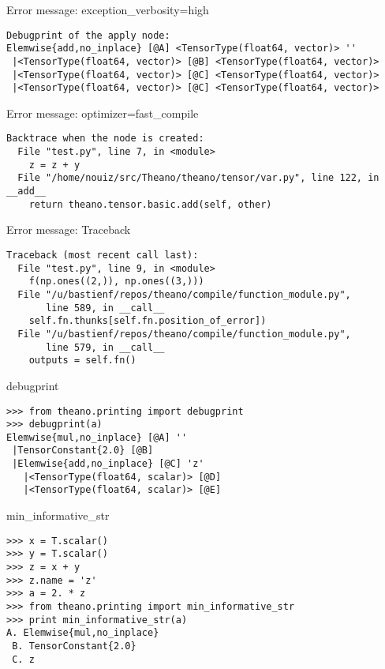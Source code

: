 \documentclass[utf8x]{beamer}
\begin{document}
\begin{frame}[fragile]{Error message: exception\_verbosity=high}
\begin{lstlisting}
Debugprint of the apply node:
Elemwise{add,no_inplace} [@A] <TensorType(float64, vector)> ''
 |<TensorType(float64, vector)> [@B] <TensorType(float64, vector)>
 |<TensorType(float64, vector)> [@C] <TensorType(float64, vector)>
 |<TensorType(float64, vector)> [@C] <TensorType(float64, vector)>
\end{lstlisting}
\end{frame}

\begin{frame}[fragile]{Error message: optimizer=fast\_compile}
\begin{lstlisting}
Backtrace when the node is created:
  File "test.py", line 7, in <module>
    z = z + y
  File "/home/nouiz/src/Theano/theano/tensor/var.py", line 122, in __add__
    return theano.tensor.basic.add(self, other)
\end{lstlisting}
\end{frame}

\begin{frame}[fragile]{Error message: Traceback}
\begin{lstlisting}
Traceback (most recent call last):
  File "test.py", line 9, in <module>
    f(np.ones((2,)), np.ones((3,)))
  File "/u/bastienf/repos/theano/compile/function_module.py",
       line 589, in __call__
    self.fn.thunks[self.fn.position_of_error])
  File "/u/bastienf/repos/theano/compile/function_module.py",
       line 579, in __call__
    outputs = self.fn()
\end{lstlisting}
\end{frame}

\begin{frame}[fragile]{debugprint}

\begin{lstlisting}
>>> from theano.printing import debugprint
>>> debugprint(a)
Elemwise{mul,no_inplace} [@A] ''
 |TensorConstant{2.0} [@B]
 |Elemwise{add,no_inplace} [@C] 'z'
   |<TensorType(float64, scalar)> [@D]
   |<TensorType(float64, scalar)> [@E]
\end{lstlisting}
\end{frame}

\begin{frame}[fragile]{min\_informative\_str}

\begin{lstlisting}
>>> x = T.scalar()
>>> y = T.scalar()
>>> z = x + y
>>> z.name = 'z'
>>> a = 2. * z
>>> from theano.printing import min_informative_str
>>> print min_informative_str(a)
A. Elemwise{mul,no_inplace}
 B. TensorConstant{2.0}
 C. z
\end{lstlisting}
\end{frame}
\end{document}
